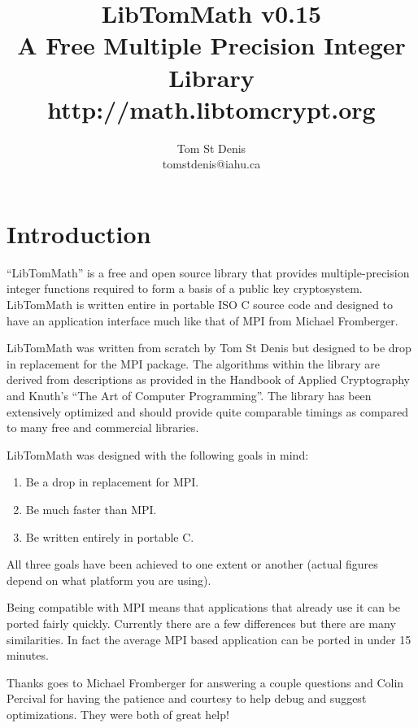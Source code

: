 \documentclass{article}
\begin{document}
\title{LibTomMath v0.15 \\ A Free Multiple Precision Integer Library \\ http://math.libtomcrypt.org }
\author{Tom St Denis \\ tomstdenis@iahu.ca}
\maketitle
\newpage

\section{Introduction}
``LibTomMath'' is a free and open source library that provides multiple-precision integer functions required to form a 
basis of a public key cryptosystem.  LibTomMath is written entire in portable ISO C source code and designed to have an 
application interface much like that of MPI from Michael Fromberger.  

LibTomMath was written from scratch by Tom St Denis but designed to be  drop in replacement for the MPI package.  The 
algorithms within the library are derived from descriptions as provided in the Handbook of Applied Cryptography and Knuth's
``The Art of Computer Programming''.  The library has been extensively optimized and should provide quite comparable 
timings as compared to many free and commercial libraries.

LibTomMath was designed with the following goals in mind:
\begin{enumerate}
\item Be a drop in replacement for MPI.
\item Be much faster than MPI.
\item Be written entirely in portable C.
\end{enumerate}

All three goals have been achieved to one extent or another (actual figures depend on what platform you are using).

Being compatible with MPI means that applications that already use it can be ported fairly quickly.  Currently there are 
a few differences but there are many similarities.  In fact the average MPI based application can be ported in under 15
minutes.  

Thanks goes to Michael Fromberger for answering a couple questions and Colin Percival for having the patience and courtesy to
help debug and suggest optimizations.  They were both of great help!
\end{document}
